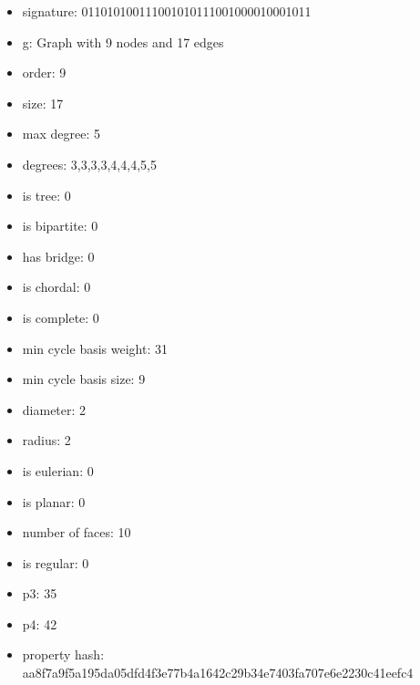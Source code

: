\newpage
\begin{figure}
\end{figure}
\begin{itemize}
\item signature: 011010100111001010111001000010001011
\item g: Graph with 9 nodes and 17 edges
\item order: 9
\item size: 17
\item max degree: 5
\item degrees: 3,3,3,3,4,4,4,5,5
\item is tree: 0
\item is bipartite: 0
\item has bridge: 0
\item is chordal: 0
\item is complete: 0
\item min cycle basis weight: 31
\item min cycle basis size: 9
\item diameter: 2
\item radius: 2
\item is eulerian: 0
\item is planar: 0
\item number of faces: 10
\item is regular: 0
\item p3: 35
\item p4: 42
\item property hash: aa8f7a9f5a195da05dfd4f3e77b4a1642c29b34e7403fa707e6e2230c41eefc4
\end{itemize}
